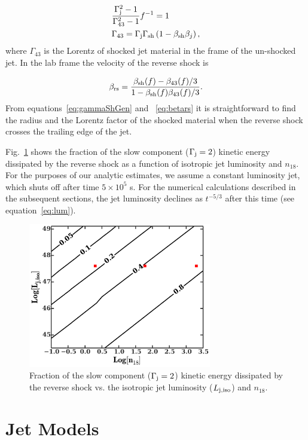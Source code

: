 \documentclass[usenatbib,fleqn]{mnras}
\begin{document}
\begin{align}
&\frac{\Gamma_{\rm j}^2-1}{\Gamma_{43}^2-1} f^{-1}=1\\
&\Gamma_{43}=\Gamma_{\rm j} \Gamma_{\rm sh} \left(1-\beta_{\rm sh} \beta_j\right),
\label{eq:gammaShGen}
\end{align}
%
where $\Gamma_{43}$ is the Lorentz of shocked jet material in the
frame of the un-shocked jet. In the lab frame the velocity of the
reverse shock is

\begin{equation}
\beta_{\rm rs}=\frac{\beta_{\rm sh}(f)-\beta_{43}(f)/3}{1-\beta_{\rm
    sh}(f) \beta_{43}(f)/3}.
\label{eq:betars}
\end{equation} 
%
From equations~\eqref{eq:gammaShGen} and ~\eqref{eq:betars} it is
straightforward to find the radius and the Lorentz factor of the
shocked material when the reverse shock crosses the trailing edge of
the jet.

Fig.~\ref{fig:diss} shows the fraction of the slow component
($\Gamma_{\rm j}=2$) kinetic energy dissipated by the reverse shock as a
function of isotropic jet luminosity and $n_{18}$. For the purposes of
our analytic estimates, we assume a constant luminosity jet, which
shuts off after time $5 \times 10^{5}$ s. For the numerical
calculations described in the subsequent sections, the jet luminosity
declines as $t^{-5/3}$ after this time (see equation~\ref{eq:lum}).

\begin{figure}
\includegraphics[width=8cm]{diss.pdf}
\caption{\label{fig:diss} Fraction of the slow component
  ($\Gamma_{\rm j}=2$) kinetic energy dissipated by the reverse shock
  vs. the isotropic jet luminosity ($L_{\rm j,iso}$) and $n_{18}$.}
\end{figure}


\section{Jet Models}
\label{sec:numerical}
\end{document}

